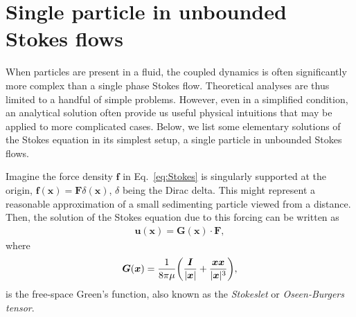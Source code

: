 \section{Single particle in unbounded Stokes flows}
\label{sec:single-p}

When particles are present in a fluid, the coupled dynamics is often significantly more complex than a single phase Stokes flow. Theoretical analyses are thus limited to a handful of simple problems. However, even in a simplified condition, an analytical solution often provide us useful physical intuitions that may be applied to more complicated cases. Below, we list some elementary solutions of the Stokes equation in its simplest setup, \ie a single particle in unbounded Stokes flows.

\bigskip
Imagine the force density ${\bm f}$ in Eq.\ \eqref{eq:Stokes} is singularly supported at the origin, \ie ${\bm f}({\bm x})={\bm F}\delta({\bm x})$, $\delta$ being the Dirac delta. This might represent a reasonable approximation of a small sedimenting particle viewed from a distance. Then, the solution of the Stokes equation due to this forcing can be written as
\begin{equation} \label{eq:stokes-green}
 \begin{aligned}
   {\bm u}({\bm x}) = {\bm G}({\bm x}) \cdot {\bm F},
 \end{aligned}
\end{equation}
where  
\begin{equation}
 \begin{aligned}
   {\bm G}({\bm x}) = \frac{1}{8\pi\mu } \bigg( \frac{{\bm I}}{\lvert\bm x\rvert}+\frac{ {\bm x}{\bm x} }{ \lvert{\bm x}\rvert^3 } \bigg),
 \end{aligned}
\end{equation}
is the free-space Green's function, also known as the \emph{Stokeslet} or \emph{Oseen-Burgers tensor}.

